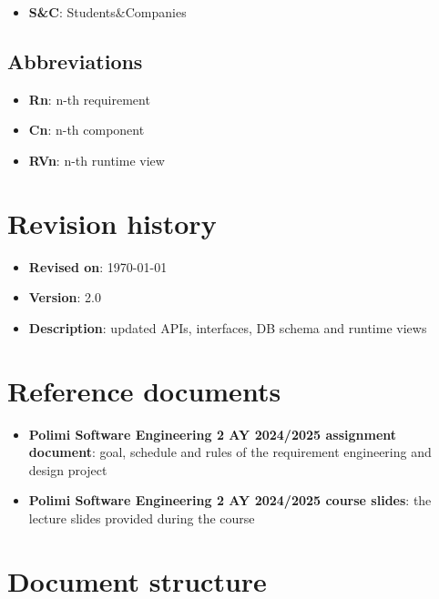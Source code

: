 \begin{itemize}
    \item \textbf{S\&C}: Students\&Companies
\end{itemize}

\subsection{Abbreviations}

\begin{itemize}
    \item \textbf{Rn}: n-th requirement
    \item \textbf{Cn}: n-th component
    \item \textbf{RVn}: n-th runtime view
\end{itemize}

\section{Revision history}

\begin{itemize}
    \item \textbf{Revised on}: \today
    \item \textbf{Version}: 2.0
    \item \textbf{Description}: updated APIs, interfaces, DB schema and runtime views
\end{itemize}

\section{Reference documents}

\begin{itemize}
    \item \textbf{Polimi Software Engineering 2 AY 2024/2025 assignment document}: goal, schedule and rules of the requirement engineering and design project
    \item \textbf{Polimi Software Engineering 2 AY 2024/2025 course slides}: the lecture slides provided during the course
\end{itemize}

\section{Document structure}

